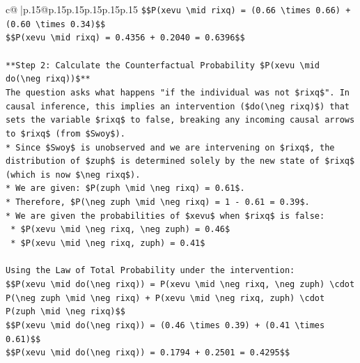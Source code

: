 \documentclass{article}
\begin{document}
{\begin{supertabular}{c@{$\;$}|p{.15\linewidth}@{}p{.15\linewidth}p{.15\linewidth}p{.15\linewidth}p{.15\linewidth}p{.15\linewidth}}
{{{\texttt{\$\$P(xevu \textbackslash{}mid rixq) = (0.66 \textbackslash{}times 0.66) + (0.60 \textbackslash{}times 0.34)\$\$} \\
\texttt{\$\$P(xevu \textbackslash{}mid rixq) = 0.4356 + 0.2040 = 0.6396\$\$} \\
\\ 
\texttt{**Step 2: Calculate the Counterfactual Probability \$P(xevu \textbackslash{}mid do(\textbackslash{}neg rixq))\$**} \\
\texttt{The question asks what happens "if the individual was not \$rixq\$". In causal inference, this implies an intervention (\$do(\textbackslash{}neg rixq)\$) that sets the variable \$rixq\$ to false, breaking any incoming causal arrows to \$rixq\$ (from \$Swoy\$).} \\
\texttt{*   Since \$Swoy\$ is unobserved and we are intervening on \$rixq\$, the distribution of \$zuph\$ is determined solely by the new state of \$rixq\$ (which is now \$\textbackslash{}neg rixq\$).} \\
\texttt{*   We are given: \$P(zuph \textbackslash{}mid \textbackslash{}neg rixq) = 0.61\$.} \\
\texttt{*   Therefore, \$P(\textbackslash{}neg zuph \textbackslash{}mid \textbackslash{}neg rixq) = 1 {-} 0.61 = 0.39\$.} \\
\texttt{*   We are given the probabilities of \$xevu\$ when \$rixq\$ is false:} \\
\texttt{    *   \$P(xevu \textbackslash{}mid \textbackslash{}neg rixq, \textbackslash{}neg zuph) = 0.46\$} \\
\texttt{    *   \$P(xevu \textbackslash{}mid \textbackslash{}neg rixq, zuph) = 0.41\$} \\
\\ 
\texttt{Using the Law of Total Probability under the intervention:} \\
\texttt{\$\$P(xevu \textbackslash{}mid do(\textbackslash{}neg rixq)) = P(xevu \textbackslash{}mid \textbackslash{}neg rixq, \textbackslash{}neg zuph) \textbackslash{}cdot P(\textbackslash{}neg zuph \textbackslash{}mid \textbackslash{}neg rixq) + P(xevu \textbackslash{}mid \textbackslash{}neg rixq, zuph) \textbackslash{}cdot P(zuph \textbackslash{}mid \textbackslash{}neg rixq)\$\$} \\
\texttt{\$\$P(xevu \textbackslash{}mid do(\textbackslash{}neg rixq)) = (0.46 \textbackslash{}times 0.39) + (0.41 \textbackslash{}times 0.61)\$\$} \\
\texttt{\$\$P(xevu \textbackslash{}mid do(\textbackslash{}neg rixq)) = 0.1794 + 0.2501 = 0.4295\$\$} \\
}}}
\end{supertabular}}
\end{document}
